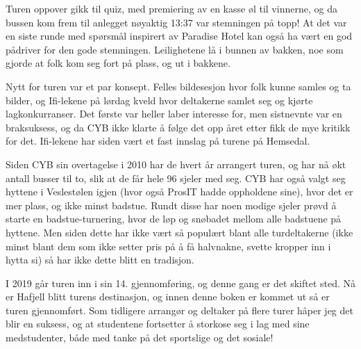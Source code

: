 Turen oppover gikk til quiz, med premiering av en kasse øl til vinnerne, og da bussen kom frem til anlegget nøyaktig 13:37 var stemningen på topp! At det var en siste runde med spørsmål inspirert av Paradise Hotel kan også ha vært en god pådriver for den gode stemningen. Leilighetene lå i bunnen av bakken, noe som gjorde at folk kom seg fort på plass, og ut i bakkene.

Nytt for turen var et par konsept. Felles bildesesjon hvor folk kunne samles og ta bilder, og Ifi-lekene på lørdag kveld hvor deltakerne samlet seg og kjørte lagkonkurranser. Det første var heller laber interesse for, men sistnevnte var en braksuksess, og da CYB ikke klarte å følge det opp året etter fikk de mye kritikk for det. Ifi-lekene har siden vært et fast innslag på turene på Hemsedal.

Siden CYB sin overtagelse i 2010 har de hvert år arrangert turen, og har nå økt antall busser til to, slik at de får hele 96 sjeler med seg. CYB har også valgt seg hyttene i Veslestølen igjen (hvor også ProsIT hadde oppholdene sine), hvor det er mer plass, og ikke minst badstue. Rundt disse har noen modige sjeler prøvd å starte en badstue-turnering, hvor de løp og snøbadet mellom alle badstuene på hyttene. Men siden dette har ikke vært så populært blant alle turdeltakerne (ikke minst blant dem som ikke setter pris på å få halvnakne, svette kropper inn i hytta si) så har ikke dette blitt en tradisjon.

I 2019 går turen inn i sin 14. gjennomføring, og denne gang er det skiftet sted. Nå er Hafjell blitt turens destinasjon, og innen denne boken er kommet ut så er turen gjennomført. Som tidligere arrangør og deltaker på flere turer håper jeg det blir en suksess, og at studentene fortsetter å storkose seg i lag med sine medstudenter, både med tanke på det sportslige og det sosiale!
